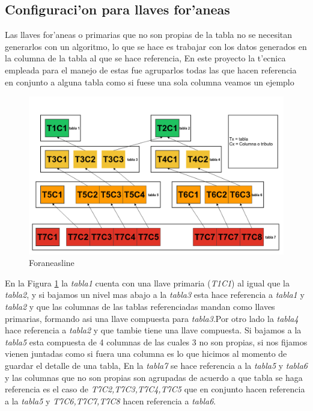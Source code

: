 \subsection{Configuraci'on para llaves for'aneas}
Las llaves for'aneas o primarias que no son propias de la tabla no se necesitan generarlos con un algoritmo, lo que se hace es trabajar con los datos generados en la columna de la tabla al que se hace referencia, En este proyecto la t'ecnica empleada para el manejo de estas fue agruparlos todas las que hacen referencia en conjunto a alguna tabla como si fuese una sola columna veamos un ejemplo
\begin{figure}[H]
\centering
\includegraphics[scale=0.4]{images/foraneasline.png}
\caption{Foraneasline}\label{fig:ejemploForaneasLine}
\end{figure}
En la Figura \ref{fig:ejemploForaneasLine} la \textit{tabla1} cuenta con una llave primaria (\textit{T1C1})  al igual que la \textit{tabla2}, y si bajamos un nivel mas abajo a la \textit{tabla3} esta hace referencia a \textit{tabla1} y \textit{tabla2} y que las columnas de las tablas referenciadas mandan como llaves primarias, formando asi una llave compuesta para \textit{tabla3}.Por otro lado la \textit{tabla4} hace referencia a \textit{tabla2} y que tambie tiene una llave compuesta. Si bajamos a la \textit{tabla5} esta compuesta de 4 columnas de las cuales 3 no son propias, si nos fijamos vienen juntadas como si fuera una columna es lo que hicimos al momento de guardar el detalle de una tabla, En la \textit{tabla7} se hace referencia a la \textit{tabla5} y \textit{tabla6} y las columnas que no son propias son agrupadas de acuerdo a que tabla se haga referencia es el caso de \textit{T7C2,T7C3,T7C4,T7C5} que en conjunto hacen referencia a la \textit{tabla5} y \textit{T7C6,T7C7,T7C8} hacen referencia a \textit{tabla6}.

